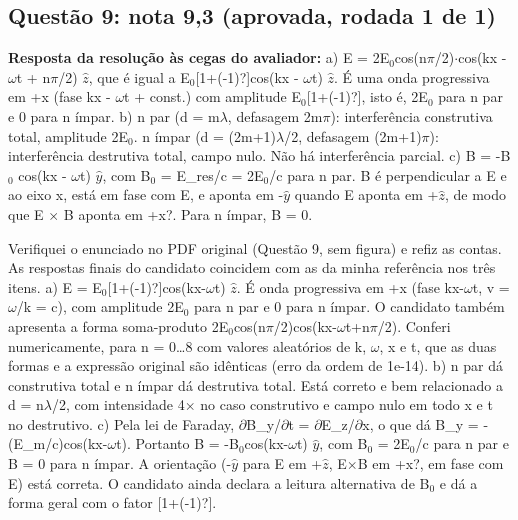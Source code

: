 \documentclass{article}%
\begin{document}
\subsection*{Questão 9: nota 9,3 (aprovada, rodada 1 de 1)}%
\textbf{Resposta da resolução às cegas do avaliador:} a) E = 2E$_{0}$cos(n$\pi$/2)$\cdot$cos(kx - $\omega$t + n$\pi$/2) $\hat z$, que é igual a E$_{0}${[}1+(-1)?{]}cos(kx - $\omega$t) $\hat z$. É uma onda progressiva em +x (fase kx - $\omega$t + const.) com amplitude E$_{0}${[}1+(-1)?{]}, isto é, 2E$_{0}$ para n par e 0 para n ímpar.\newline%
\newline%
b) n par (d = m$\lambda$, defasagem 2m$\pi$): interferência construtiva total, amplitude 2E$_{0}$. n ímpar (d = (2m+1)$\lambda$/2, defasagem (2m+1)$\pi$): interferência destrutiva total, campo nulo. Não há interferência parcial.\newline%
\newline%
c) B = -B$_{0}$ cos(kx - $\omega$t) $\hat y$, com B$_{0}$ = E\_res/c = 2E$_{0}$/c para n par. B é perpendicular a E e ao eixo x, está em fase com E, e aponta em -$\hat y$ quando E aponta em +$\hat z$, de modo que E $\times$ B aponta em +x?. Para n ímpar, B = 0.\par %
Verifiquei o enunciado no PDF original (Questão 9, sem figura) e refiz as contas. As respostas finais do candidato coincidem com as da minha referência nos três itens.\newline%
\newline%
a) E = E$_{0}${[}1+(-1)?{]}cos(kx-$\omega$t) $\hat z$. É onda progressiva em +x (fase kx-$\omega$t, v = $\omega$/k = c), com amplitude 2E$_{0}$ para n par e 0 para n ímpar. O candidato também apresenta a forma soma{-}produto 2E$_{0}$cos(n$\pi$/2)cos(kx-$\omega$t+n$\pi$/2). Conferi numericamente, para n = 0\ldots{}8 com valores aleatórios de k, $\omega$, x e t, que as duas formas e a expressão original são idênticas (erro da ordem de 1e{-}14).\newline%
\newline%
b) n par dá construtiva total e n ímpar dá destrutiva total. Está correto e bem relacionado a d = n$\lambda$/2, com intensidade 4$\times$ no caso construtivo e campo nulo em todo x e t no destrutivo.\newline%
\newline%
c) Pela lei de Faraday, $\partial$B\_y/$\partial$t = $\partial$E\_z/$\partial$x, o que dá B\_y = -(E\_m/c)cos(kx-$\omega$t). Portanto B = -B$_{0}$cos(kx-$\omega$t) $\hat y$, com B$_{0}$ = 2E$_{0}$/c para n par e B = 0 para n ímpar. A orientação (-$\hat y$ para E em +$\hat z$, E$\times$B em +x?, em fase com E) está correta. O candidato ainda declara a leitura alternativa de B$_{0}$ e dá a forma geral com o fator {[}1+(-1)?{]}.\newline%
\end{document}
